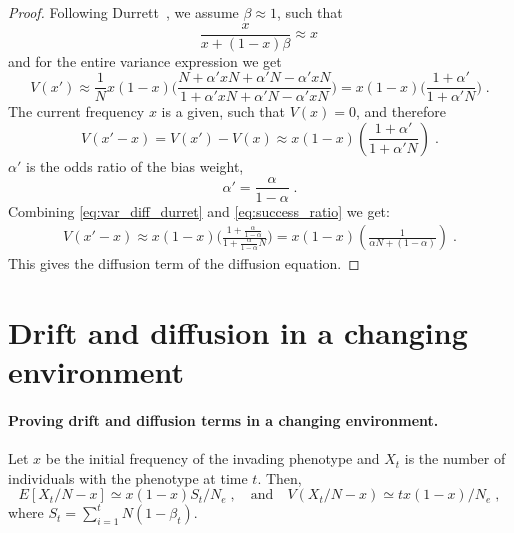\documentclass[12pt]{extarticle}
\begin{document}
\begin{appendices}
\begin{proof}
Following Durrett~\citep[ch~7.2]{durret}, we assume $\beta \approx 1$, such that
\begin{equation}
\frac{x}{x + (1-x)\beta} \approx x \,
\end{equation}
and for the entire variance expression we get
\begin{equation}
V(x') \approx  \frac{1}{N} x(1-x)
\Big(\frac{N + \alpha' xN + \alpha' N - \alpha' xN}{1 + \alpha' xN + \alpha' N - \alpha' xN}\Big)
= x(1-x)\Big(\frac{1 + \alpha'}{1 + \alpha' N}\Big) \;.
\end{equation}
The current frequency $x$ is a given, such that $V(x) = 0$,
and therefore
\begin{equation}\label{eq:var_diff_durret}
V(x'-x) = V(x') - V(x) \approx  x(1-x)(\frac{1 + \alpha'}{1 + \alpha' N}) \;.
\end{equation}
$\alpha'$ is the odds ratio of the bias weight, 
\begin{equation}\label{eq:success_ratio}
\alpha' = \frac{\alpha}{1-\alpha} \;.
\end{equation}
Combining \cref{eq:var_diff_durret} and \cref{eq:success_ratio} we get:
\begin{equation}\label{eq:const_var}
\begin{split}
V(x'-x) \approx x(1-x)\Big(\frac{1 + \frac{\alpha}{1-\alpha}}{1 + \frac{\alpha}{1-\alpha} N}\Big)
  = x(1-x)(\frac{1}{\alpha N + (1-\alpha)}) \;.
\end{split}
\end{equation}
This gives the diffusion term of the diffusion equation.
\end{proof}

\section{Drift and diffusion in a changing environment} \label{sec:drift_diff_chang}
\paragraph{Proving drift and diffusion terms in a changing environment.}
Let $x$ be the initial frequency of the invading phenotype and $X_t$ is the number of individuals with the phenotype at time $t$.
Then,
\begin{equation*}
E[X_t/N - x] \simeq x(1-x) S_t / N_e \;, 
\quad
\text{and}
\quad
V(X_t/N-x) \simeq  t x(1-x) / N_e \;,
\end{equation*}
where $S_t=\sum\limits_{i=1}^{t} N (1-\beta_t)$.



\end{appendices}
\end{document}

